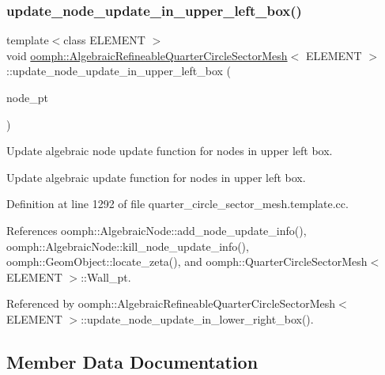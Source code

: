 \subsubsection{\texorpdfstring{update\+\_\+node\+\_\+update\+\_\+in\+\_\+upper\+\_\+left\+\_\+box()}{update\_node\_update\_in\_upper\_left\_box()}}
{\footnotesize\ttfamily template$<$class E\+L\+E\+M\+E\+NT $>$ \\
void \hyperlink{classoomph_1_1AlgebraicRefineableQuarterCircleSectorMesh}{oomph\+::\+Algebraic\+Refineable\+Quarter\+Circle\+Sector\+Mesh}$<$ E\+L\+E\+M\+E\+NT $>$\+::update\+\_\+node\+\_\+update\+\_\+in\+\_\+upper\+\_\+left\+\_\+box (\begin{DoxyParamCaption}\item[{\hyperlink{classoomph_1_1AlgebraicNode}{Algebraic\+Node} $\ast$\&}]{node\+\_\+pt }\end{DoxyParamCaption})\hspace{0.3cm}{\ttfamily [private]}}



Update algebraic node update function for nodes in upper left box. 

Update algebraic update function for nodes in upper left box. 

Definition at line 1292 of file quarter\+\_\+circle\+\_\+sector\+\_\+mesh.\+template.\+cc.



References oomph\+::\+Algebraic\+Node\+::add\+\_\+node\+\_\+update\+\_\+info(), oomph\+::\+Algebraic\+Node\+::kill\+\_\+node\+\_\+update\+\_\+info(), oomph\+::\+Geom\+Object\+::locate\+\_\+zeta(), and oomph\+::\+Quarter\+Circle\+Sector\+Mesh$<$ E\+L\+E\+M\+E\+N\+T $>$\+::\+Wall\+\_\+pt.



Referenced by oomph\+::\+Algebraic\+Refineable\+Quarter\+Circle\+Sector\+Mesh$<$ E\+L\+E\+M\+E\+N\+T $>$\+::update\+\_\+node\+\_\+update\+\_\+in\+\_\+lower\+\_\+right\+\_\+box().



\subsection{Member Data Documentation}
\mbox{\label{classoomph_1_1AlgebraicRefineableQuarterCircleSectorMesh_aed38fed1e464c86e3dedd377e2459de7}} 
